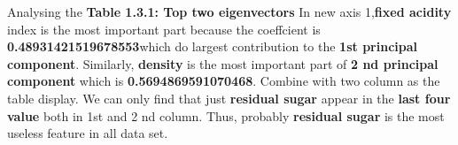 \documentclass[titlepage,a4paper,12pt,thmsb]{report}
\begin{document}
\newpage

Analysing the {\bf{Table 1.3.1: Top two eigenvectors}} In new axis 1,{\bf fixed acidity} index is the most important part because the coeffcient is {\bf 0.48931421519678553}which do largest contribution to the {\bf 1st principal component}. Similarly, {\bf density} is the most important part of {\bf 2 nd principal component} which is {\bf 0.5694869591070468}.
Combine with two column as the table display. We can only find that just {\bf residual sugar} appear in the {\bf last four value} both in 1st and 2 nd column. Thus, probably {\bf residual sugar} is the most useless feature in all data set.

\newpage

\begin{center}
\begin{figure}[h]
{\par}
\end{figure}
{}
\end{center}


\begin{center}
\begin{figure}[h]
{\par}
\end{figure}
{}
\end{center}
\end{document}
